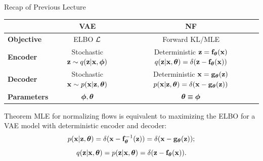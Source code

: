 \documentclass{beamer}
\begin{document}
\begin{frame}{Recap of Previous Lecture}
	\begin{table}[]
		\begin{tabular}{l|c|c}
			& \textbf{VAE} & \textbf{NF} \\ \hline
			\textbf{Objective} & ELBO $\mathcal{L}$ & Forward KL/MLE \\ \hline
			\textbf{Encoder} & \shortstack{Stochastic \\ $\mathbf{z} \sim q (\mathbf{z} | \mathbf{x}, \boldsymbol{\phi})$} &  \shortstack{\\ Deterministic \\ $\mathbf{z} = \mathbf{f}_{\boldsymbol{\theta}}(\mathbf{x})$ \\ $q(\mathbf{z} | \mathbf{x}, \boldsymbol{\theta}) = \delta(\mathbf{z} - \mathbf{f}_{\boldsymbol{\theta}}(\mathbf{x}))$}  \\ \hline
			\textbf{Decoder} & \shortstack{Stochastic \\ $\mathbf{x} \sim p (\mathbf{x} | \mathbf{z}, \boldsymbol{\theta})$} & \shortstack{\\ Deterministic \\ $\mathbf{x} = \mathbf{g}_{\boldsymbol{\theta}}(\mathbf{z})$ \\ $ p(\mathbf{x} | \mathbf{z}, \boldsymbol{\theta}) = \delta(\mathbf{x} - \mathbf{g}_{\boldsymbol{\theta}}(\mathbf{z}))$} \\ \hline
			\textbf{Parameters}  & $\boldsymbol{\phi}, \boldsymbol{\theta}$ & $\boldsymbol{\theta} \equiv \boldsymbol{\phi}$\\ 
		\end{tabular}
	\end{table}
	\vspace{-0.3cm}
	\begin{block}{Theorem}
		MLE for normalizing flows is equivalent to maximizing the ELBO for a VAE model with deterministic encoder and decoder:
		\vspace{-0.3cm}
		\[
			p(\mathbf{x} | \mathbf{z}, \boldsymbol{\theta}) = \delta (\mathbf{x} - \mathbf{f}^{-1}_{\boldsymbol{\theta}}(\mathbf{z})) = \delta (\mathbf{x} - \mathbf{g}_{\boldsymbol{\theta}}(\mathbf{z}));
		\]
		\[
			q(\mathbf{z} | \mathbf{x}, \boldsymbol{\theta}) = p(\mathbf{z} | \mathbf{x}, \boldsymbol{\theta}) = \delta (\mathbf{z} - \mathbf{f}_{\boldsymbol{\theta}}(\mathbf{x})).
		\]
	\end{block}
\end{frame}
\end{document}
